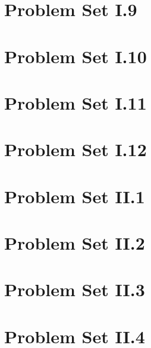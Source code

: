 \documentclass{article}
\renewcommand{\(}{\left(}
\renewcommand{\)}{\right)}
\theoremstyle{plain}
\theoremstyle{plain}
\theoremstyle{definition}
\begin{document}
\section{Problem Set I.9}
\section{Problem Set I.10}
\section{Problem Set I.11}
\section{Problem Set I.12}
\section{Problem Set II.1}
\section{Problem Set II.2}
\section{Problem Set II.3}
\section{Problem Set II.4}
\end{document}
